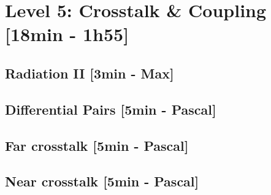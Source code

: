 
\section{Level 5: Crosstalk \& Coupling [18min - 1h55]}

\subsection{Radiation II [3min - Max]}

\subsection{Differential Pairs [5min - Pascal]}

\subsection{Far crosstalk [5min - Pascal]}

\subsection{Near crosstalk [5min - Pascal]}
